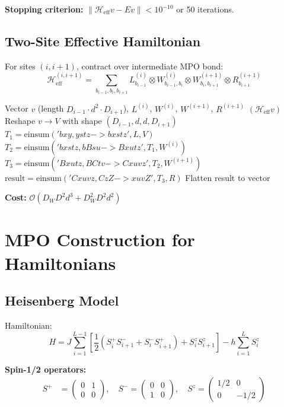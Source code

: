 \documentclass[aps,prb,onecolumn,scriptaddress]{revtex4-2}
\begin{document}
	\textbf{Stopping criterion:} $\|\mathcal{H}_{\text{eff}} v - E v\| < 10^{-10}$ or 50 iterations.
	
	\subsection{Two-Site Effective Hamiltonian}
	
	For sites $(i, i+1)$, contract over intermediate MPO bond:
	\begin{equation}
		\mathcal{H}_{\text{eff}}^{(i,i+1)} = \sum_{b_{i-1}, b_i, b_{i+1}} 
		L^{(i)}_{b_{i-1}} \otimes W^{(i)}_{b_{i-1}, b_i} \otimes W^{(i+1)}_{b_i, b_{i+1}} \otimes R^{(i+1)}_{b_{i+1}}
	\end{equation}
	
	\begin{algorithm}[H]
		\caption{ApplyHeff (Two-Site)}
		\begin{algorithmic}[1]
			\Require Vector $v$ (length $D_{i-1} \cdot d^2 \cdot D_{i+1}$), $L^{(i)}$, $W^{(i)}$, $W^{(i+1)}$, $R^{(i+1)}$
			\Ensure $(\mathcal{H}_{\text{eff}} v)$
			\State Reshape $v \to V$ with shape $(D_{i-1}, d, d, D_{i+1})$
			\State $T_1 = \text{einsum}('bxy,ystz->bxstz', L, V)$
			\State $T_2 = \text{einsum}('bxstz,bBsu->Bxutz', T_1, W^{(i)})$
			\State $T_3 = \text{einsum}('Bxutz,BCtv->Cxuvz', T_2, W^{(i+1)})$
			\State $\text{result} = \text{einsum}('Cxuvz,CzZ->xuvZ', T_3, R)$
			\State \Return Flatten result to vector
		\end{algorithmic}
	\end{algorithm}
	
	\textbf{Cost:} $\mathcal{O}(D_W D^2 d^3 + D_W^2 D^2 d^2)$
	
	\section{MPO Construction for Hamiltonians}
	
	\subsection{Heisenberg Model}
	
	Hamiltonian:
	\begin{equation}
		H = J \sum_{i=1}^{L-1} \left[\frac{1}{2}(S_i^+ S_{i+1}^- + S_i^- S_{i+1}^+) + S_i^z S_{i+1}^z\right] - h \sum_{i=1}^L S_i^z
	\end{equation}
	
	\textbf{Spin-1/2 operators:}
	\begin{align}
		S^+ &= \begin{pmatrix} 0 & 1 \\ 0 & 0 \end{pmatrix}, \quad
		S^- = \begin{pmatrix} 0 & 0 \\ 1 & 0 \end{pmatrix}, \quad
		S^z = \begin{pmatrix} 1/2 & 0 \\ 0 & -1/2 \end{pmatrix}
	\end{align}
	
\end{document}
